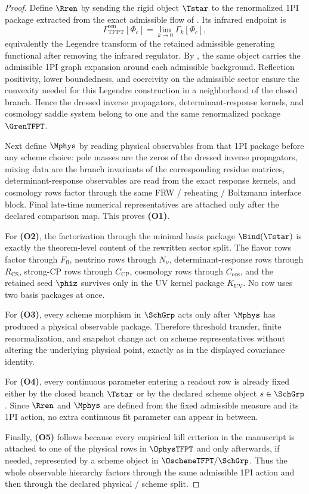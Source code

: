 \begin{proof}
Define $\Rren$ by sending the rigid object $\Tstar$ to the renormalized 1PI package extracted from
the exact admissible flow of . Its infrared endpoint is
\[
\Gamma_{\mathrm{TFPT}}^{\mathrm{ren}}[\Phi_c]
=
\lim_{k\to0}\Gamma_k[\Phi_c],
\]
equivalently the Legendre transform of the retained admissible generating functional after removing
the infrared regulator. By , the same object carries the
admissible 1PI graph expansion around each admissible background. Reflection positivity, lower
boundedness, and coercivity on the admissible sector ensure the convexity needed for this Legendre
construction in a neighborhood of the closed branch. Hence the dressed inverse propagators,
determinant-response kernels, and cosmology saddle system belong to one and the same renormalized
package $\GrenTFPT$.

Next define $\Mphys$ by reading physical observables from that 1PI package before any scheme choice:
pole masses are the zeros of the dressed inverse propagators, mixing data are the branch invariants
of the corresponding residue matrices, determinant-response observables are read from the exact
response kernels, and cosmology rows factor through the same FRW / reheating / Boltzmann interface
block. Final late-time numerical representatives are attached only after the declared comparison
map. This proves \textbf{(O1)}.

For \textbf{(O2)}, the factorization through the minimal basis package $\Bind(\Tstar)$ is exactly
the theorem-level content of the rewritten sector split. The flavor rows factor through
$F_{\mathrm{fl}}$, neutrino rows through $N_\nu$, determinant-response rows through
$R_{\mathrm{CS}}$, strong-CP rows through $C_{\mathrm{CP}}$, cosmology rows through
$C_{\mathrm{cos}}$, and the retained seed $\phiz$ survives only in the UV kernel package
$K_{\mathrm{UV}}$. No row uses two basis packages at once.

For \textbf{(O3)}, every scheme morphism in $\SchGrp$ acts only after $\Mphys$ has produced a
physical observable package. Therefore threshold transfer, finite renormalization, and snapshot
change act on scheme representatives without altering the underlying physical point, exactly as in
the displayed covariance identity.

For \textbf{(O4)}, every continuous parameter entering a readout row is already fixed either by the
closed branch $\Tstar$ or by the declared scheme object $s\in\SchGrp$. Since $\Rren$ and $\Mphys$
are defined from the fixed admissible measure and its 1PI action, no extra continuous fit parameter
can appear in between.

Finally, \textbf{(O5)} follows because every empirical kill criterion in the manuscript is attached
to one of the physical rows in $\OphysTFPT$ and only afterwards, if needed, represented by a scheme
object in $\OschemeTFPT/\SchGrp$. Thus the whole observable hierarchy factors through the same
admissible 1PI action and then through the declared physical / scheme split.
\end{proof}
